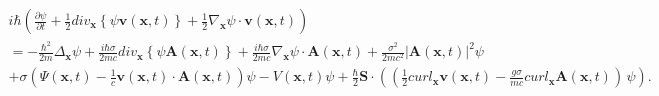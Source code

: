 \documentclass{article}
\theoremstyle{definition}
\theoremstyle{remark}
\renewcommand{\vec}[1]{\mathbf{#1}}
\begin{document}
\begin{multline}\label{vhfffngghkjgghfjjghghghSYShmyuuiiuuhmhmiopoopnniukjhjkk;l;lkhjjkihjjhkkkkkjjjZZ}
i\hbar\left(\frac{\partial\psi}{\partial t}+\frac{1}{2}div_{\vec
x}\left\{\psi\vec v(\vec x,t)\right\}+\frac{1}{2}\nabla_{\vec
x}\psi\cdot\vec v(\vec x,t)\right)\\=-\frac{\hbar^2}{2m}\Delta_{\vec
x}\psi+\frac{i\hbar\sigma}{2mc}div_{\vec x}\left\{\psi\vec A(\vec
x,t)\right\}+\frac{i\hbar\sigma}{2mc}\nabla_{\vec x}\psi\cdot\vec
A(\vec x,t)+\frac{\sigma^2}{2mc^2}\left|\vec A(\vec
x,t)\right|^2\psi\\
%
%
%
+\sigma\left(\Psi(\vec x,t)-\frac{1}{c}\vec v(\vec x,t)\cdot\vec
A(\vec x,t)\right)\psi-V\left(\vec
x,t\right)\psi+\frac{\hbar}{2}\vec
S\cdot\left(\left(\frac{1}{2}curl_{\vec x}\vec v(\vec
x,t)-\frac{g\sigma}{mc}curl_{\vec x}\vec A(\vec
x,t)\right)\,\psi\right).
\end{multline}
\end{document}
